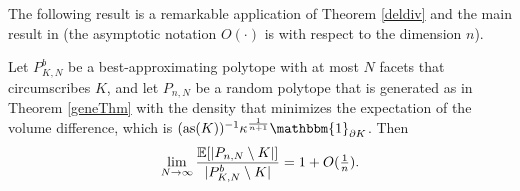 % 




 The following result is a remarkable application of Theorem \ref{deldiv} and the main result in  \cite{boroczky2004approximation} (the asymptotic notation $O(\cdot)$  is with respect to the dimension $n$).
\begin{corollary}\label{randomvsbest}
	Let $ P_{K,N}^b $ be a best-approximating polytope with at most $N$ facets that circumscribes $K$, and let $ P_{n,N} $ be a random polytope that is generated as in Theorem \ref{geneThm} with the density that minimizes the expectation of the volume difference, which is  $ (\as(K))^{-1}\kappa^{\frac{1}{n+1}}\mathbbm{1}_{\partial K}$. Then
		\begin{equation}\label{noCovexlim}
	\lim_{N\to\infty}\frac{{\mathbb{E}}[|P_{n,N}\setminus K|]}{|P_{K,N}^b \setminus K|} 
	= 1+O(\tfrac 1n).
	\end{equation}
\end{corollary}

